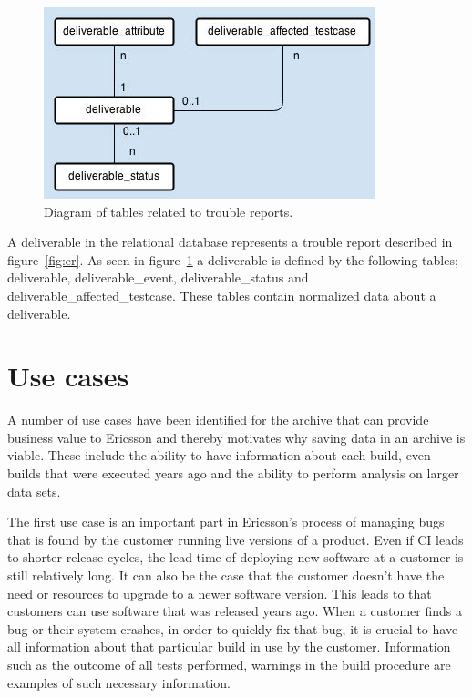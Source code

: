 \begin{figure}[h!]
\centering
\includegraphics[scale=0.5]{figure/deliverable.jpg}
\caption{Diagram of tables related to trouble reports.}
\label{fig:deliverable}
\end{figure}
A deliverable in the relational database represents a trouble report described in figure~\ref{fig:er}. As seen in figure~\ref{fig:deliverable} a deliverable is defined by the following tables; deliverable, deliverable\_event, deliverable\_status and deliverable\_affected\_testcase. These tables contain normalized data about a deliverable. 


\section{Use cases}
\label{sec:usecases}
A number of use cases have been identified for the archive that can provide business value to Ericsson and thereby motivates why saving data in an archive is viable. These include the ability to have information about each build, even builds that were executed years ago and the ability to perform analysis on larger data sets. 

The first use case is an important part in Ericsson's process of managing bugs that is found by the customer running live versions of a product. Even if CI leads to shorter release cycles, the lead time of deploying new software at a customer is still relatively long. It can also be the case that the customer doesn't have the need or resources to upgrade to a newer software version. This leads to that customers can use software that was released years ago. When a customer finds a bug or their system crashes, in order to quickly fix that bug, it is crucial to have all information about that particular build in use by the customer. Information such as the outcome of all tests performed, warnings in the build procedure are examples of such necessary information. 

